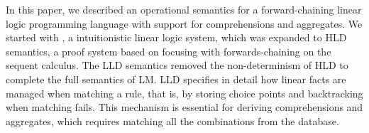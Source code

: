 In this paper, we described an operational semantics for a forward-chaining
linear logic programming language with support for comprehensions and
aggregates. We started with \fragment, a intuitionistic linear logic system,
which was expanded to HLD semantics, a proof system based on focusing with
forwards-chaining on the sequent calculus. The LLD semantics removed the
non-determinism of HLD to complete the full semantics of LM. LLD specifies in
detail how linear facts are managed when matching a rule, that is, by storing
choice points and backtracking when matching fails. This mechanism is essential
for deriving comprehensions and aggregates, which requires matching all the
combinations from the database.
